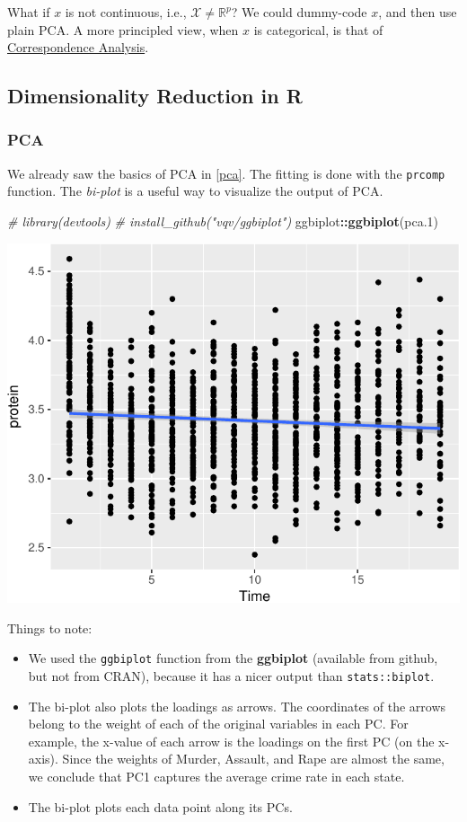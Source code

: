 \documentclass[]{book}
\newenvironment{Shaded}{\begin{snugshade}}{\end{snugshade}}
\newcommand{\KeywordTok}[1]{\textcolor[rgb]{0.13,0.29,0.53}{\textbf{#1}}}
\newcommand{\DecValTok}[1]{\textcolor[rgb]{0.00,0.00,0.81}{#1}}
\newcommand{\CommentTok}[1]{\textcolor[rgb]{0.56,0.35,0.01}{\textit{#1}}}
\newcommand{\OperatorTok}[1]{\textcolor[rgb]{0.81,0.36,0.00}{\textbf{#1}}}
\newcommand{\NormalTok}[1]{#1}
\providecommand{\tightlist}{%
  \setlength{\itemsep}{0pt}\setlength{\parskip}{0pt}}
\theoremstyle{definition}
\theoremstyle{definition}
\theoremstyle{definition}
\theoremstyle{remark}
\begin{document}
What if \(x\) is not continuous, i.e., \(\mathcal{X}\neq \mathbb{R}^p\)?
We could dummy-code \(x\), and then use plain PCA. A more principled
view, when \(x\) is categorical, is that of
\href{https://en.wikipedia.org/wiki/Correspondence_analysis}{Correspondence
Analysis}.

\subsection{Dimensionality Reduction in
R}\label{dimensionality-reduction-in-r}

\subsubsection{PCA}\label{pca-in-r}

We already saw the basics of PCA in \ref{pca}. The fitting is done with
the \texttt{prcomp} function. The \emph{bi-plot} is a useful way to
visualize the output of PCA.

\begin{Shaded}
\begin{Highlighting}[]
\CommentTok{# library(devtools)}
\CommentTok{# install_github("vqv/ggbiplot")}
\NormalTok{ggbiplot}\OperatorTok{::}\KeywordTok{ggbiplot}\NormalTok{(pca.}\DecValTok{1}\NormalTok{) }
\end{Highlighting}
\end{Shaded}

\includegraphics[width=0.5\linewidth]{Rcourse_files/figure-latex/unnamed-chunk-232-1}

Things to note:

\begin{itemize}
\tightlist
\item
  We used the \texttt{ggbiplot} function from the \textbf{ggbiplot}
  (available from github, but not from CRAN), because it has a nicer
  output than \texttt{stats::biplot}.
\item
  The bi-plot also plots the loadings as arrows. The coordinates of the
  arrows belong to the weight of each of the original variables in each
  PC. For example, the x-value of each arrow is the loadings on the
  first PC (on the x-axis). Since the weights of Murder, Assault, and
  Rape are almost the same, we conclude that PC1 captures the average
  crime rate in each state.
\item
  The bi-plot plots each data point along its PCs.
\end{itemize}
\end{document}
